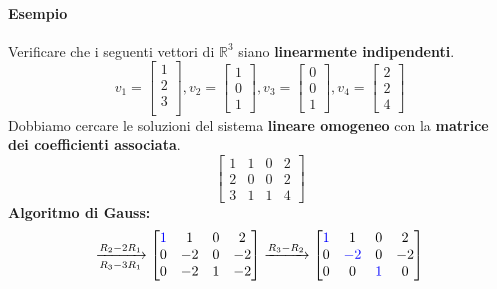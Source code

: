 \documentclass[a4paper, 12pt]{report}
\begin{document}
                \paragraph{Esempio} Verificare che i seguenti vettori di $\mathbb{R}^3$ siano \textbf{linearmente indipendenti}.
                    $$
                    v_1=
                    \begin{bmatrix}
                        1\\
                        2\\
                        3\\
                    \end{bmatrix},
                    v_2=
                    \begin{bmatrix}
                        1\\
                        0\\
                        1
                    \end{bmatrix},
                    v_3=
                    \begin{bmatrix}
                        0\\
                        0\\
                        1
                    \end{bmatrix},
                    v_4=
                    \begin{bmatrix}
                        2\\
                        2\\
                        4
                    \end{bmatrix}
                    $$
                Dobbiamo cercare le soluzioni del sistema \textbf{lineare omogeneo} con la \textbf{matrice dei coefficienti associata}.
                    $$
                    \begin{bmatrix}
                        1 & 1 & 0 & 2\\
                        2 & 0 & 0 & 2\\
                        3 & 1 & 1 & 4
                    \end{bmatrix}
                    $$
                \textbf{Algoritmo di Gauss:}
                    $$
                    \xrightarrow[R_3-3R_1]{R_2-2R_1}
                    \begin{bmatrix}
                        \textcolor{blue}{1} & 1 & 0 & 2\\
                        0 & -2 & 0 & -2\\
                        0 & -2 & 1 & -2
                    \end{bmatrix}
                    \xrightarrow{R_3-R_2}
                    \begin{bmatrix}
                        \textcolor{blue}{1} & 1 & 0 & 2\\
                        0 & \textcolor{blue}{-2} & 0 & -2\\
                        0 & 0 & \textcolor{blue}{1} & 0
                    \end{bmatrix}
                    $$
\end{document}
